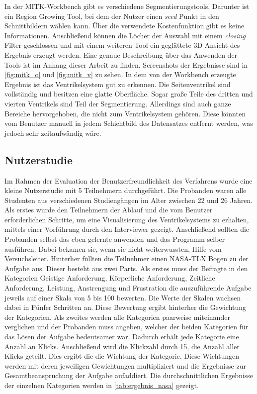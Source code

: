In der MITK-Workbench gibt es verschiedene Segmentierungstools. Darunter ist ein Region Growing Tool, bei dem der Nutzer einen \textit{seed} Punkt in den Schnittbildern wählen kann. Über die verwendete Kostenfunktion gibt es keine Informationen.
Anschließend können die Löcher der Auswahl mit einem \textit{closing} Filter geschlossen und mit einem weiteren Tool ein geglättete 3D Ansicht des Ergebnis erzeugt werden. Eine genaue Beschreibung über das Anwenden der Tools ist im Anhang dieser Arbeit zu finden.
\newline
Screenshots der Ergebnisse sind in \autoref{fig:mitk_o} und \autoref{fig:mitk_v} zu sehen. In dem von der Workbench erzeugte Ergebnis ist das Ventrikelsystem gut zu erkennen. Die Seitenventrikel sind vollständig und besitzen eine glatte Oberfläche. Sogar große Teile des dritten und vierten Ventrikels sind Teil der Segmentierung.
Allerdings sind auch ganze Bereiche hervorgehoben, die nicht zum Ventrikelsystem gehören. Diese könnten vom Benutzer manuell in jedem Schichtbild des Datensatzes entfernt werden, was jedoch sehr zeitaufwändig wäre.


\subsection{Nutzerstudie}


Im Rahmen der Evaluation der Benutzerfreundlichkeit des Verfahrens wurde eine kleine Nutzerstudie mit 5 Teilnehmern durchgeführt. Die Probanden waren alle Studenten aus verschiedenen Studiengängen im Alter zwischen 22 und 26 Jahren.
Als erstes wurde den Teilnehmern der Ablauf und die vom Benutzer erforderlichen Schritte, um eine Visualisierung des Ventrikelsystems zu erhalten, mittels einer Vorführung durch den Interviewer gezeigt.
Anschließend sollten die Probanden selbst das eben gelernte anwenden und das Programm selber ausführen. Dabei bekamen sie, wenn sie nicht weiterwussten, Hilfe vom Versuchsleiter.
\newline
Hinterher füllten die Teilnehmer einen NASA-TLX Bogen zu der Aufgabe aus. Dieser besteht aus zwei Parts. Als erstes muss der Befragte in den Kategorien Geistige Anforderung, Körperliche Anforderung, Zeitliche Anforderung, Leistung, Anstrengung und Frustration die auszuführende Aufgabe jeweils auf einer Skala von 5 bis 100 bewerten. Die Werte der Skalen wachsen dabei in Fünfer Schritten an. Diese Bewertung ergibt hinterher die Gewichtung der Kategorien.
Als zweites werden alle Kategorien paarweise miteinander verglichen und der Probanden muss angeben, welcher der beiden Kategorien für das Lösen der Aufgabe bedeutsamer war. Dadurch erhält jede Kategorie eine Anzahl an Klicks.
Anschließend wird die Klickzahl durch 15, die Anzahl aller Klicks geteilt. Dies ergibt die die Wichtung der Kategorie. Diese Wichtungen werden mit deren jeweiligen Gewichtungen multipliziert und die Ergebnisse zur Gesamtbeanspruchung der Aufgabe aufaddiert.
Die durchschnittlichen Ergebnisse der einzelnen Kategorien werden in \autoref{tab:ergebnis_nasa} gezeigt.


